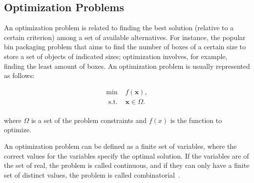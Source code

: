 \documentclass[conference,harvard,brazil,english]{sbatex}
\begin{document}
\subsection{Optimization Problems}

An optimization problem is related to finding the best solution (relative to a certain criterion) among a set of available alternatives. For instance, the popular bin packaging problem that aims to find the number of boxes of a certain size to store a set of objects of indicated sizes; optimization involves, for example, finding the least amount of boxes. An optimization problem is usually represented as follows:

\begin{equation}
	\label{eq:optproblema}
	\begin{array}{cc}
		\min & f(\textbf{x}),  \\
		\textrm{ s.t. } & \textbf{x}\in\Omega.\\
	\end{array}
\end{equation}	

\noindent where $\Omega$ is a set of the problem constraints and $f(x)$ is the function to optimize.
	
An optimization problem can be defined as a finite set of variables, where the correct values for the variables specify the optimal solution. If the variables are of the set of real, the problem is called continuous, and if they can only have a finite set of distinct values, the problem is called combinatorial~\cite{korte2012combinatorial}.
\end{document}
